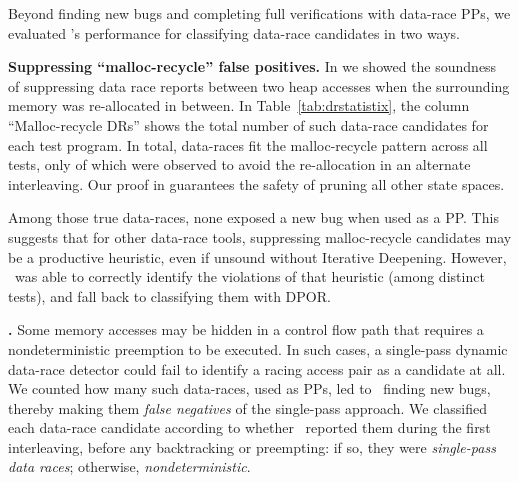 Beyond finding new bugs and completing full verifications with data-race PPs, we evaluated \quicksand's performance for classifying data-race candidates in two ways.

{\bf Suppressing ``malloc-recycle'' false positives.}
In \sect{\ref{sec:recycle}} we showed the soundness of suppressing data race reports between two heap accesses when the surrounding memory was re-allocated in between.
In Table~\ref{tab:drstatistix}, the column ``Malloc-recycle DRs'' shows the total number of such data-race candidates for each test program.
In total,  data-races fit the malloc-recycle pattern across all tests,
only  of which were observed to avoid the re-allocation in an alternate interleaving.
Our proof in \sect{\ref{sec:recycle}} guarantees the safety of pruning all  other state spaces.

Among those  true data-races, %
none exposed a new bug when used as a PP.
This suggests that for other data-race tools,
suppressing malloc-recycle candidates may be a productive heuristic,
even if unsound without Iterative Deepening.
However, \quicksand~was able to correctly identify the  violations of that heuristic (among  distinct tests),
and fall back to classifying them with DPOR.


{\bf {}.}
Some memory accesses may be hidden in a control flow path that requires a nondeterministic preemption to be executed.
In such cases, a single-pass dynamic data-race detector
could fail
to identify a racing access pair as a candidate at all. %
%
We counted how many such data-races, used as PPs, led to \quicksand~finding new bugs,
thereby making them {\em false negatives} of the single-pass approach.
We classified each data-race candidate according to whether \landslide~reported them during the first interleaving,
before any backtracking or preempting:
if so, they were {\em single-pass data races}; otherwise, {\em nondeterministic}.

